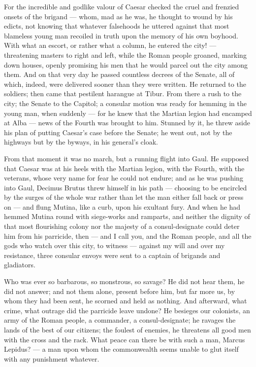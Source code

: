  For the incredible and godlike valour of Caesar checked the cruel and frenzied onsets of the brigand --- whom, mad as he was, he thought to wound by his edicts, not knowing that whatever falsehoods he uttered against that most blameless young man recoiled in truth upon the memory of his own boyhood. With what an escort, or rather what a column, he entered the city! --- threatening masters to right and left, while the Roman people groaned, marking down houses, openly promising his men that he would parcel out the city among them. And on that very day he passed countless decrees of the Senate, all of which, indeed, were delivered sooner than they were written. He returned to the soldiers; then came that pestilent harangue at Tibur. From there a rush to the city; the Senate to the Capitol; a consular motion was ready for hemming in the young man, when suddenly --- for he knew that the Martian legion had encamped at Alba --- news of the Fourth was brought to him. Stunned by it, he threw aside his plan of putting Caesar's case before the Senate; he went out, not by the highways but by the byways, in his general's cloak.

 From that moment it was no march, but a running flight into Gaul. He supposed that Caesar was at his heels with the Martian legion, with the Fourth, with the veterans, whose very name for fear he could not endure; and as he was pushing into Gaul, Decimus Brutus threw himself in his path --- choosing to be encircled by the surges of the whole war rather than let the man either fall back or press on --- and flung Mutina, like a curb, upon his exultant fury. And when he had hemmed Mutina round with siege-works and ramparts, and neither the dignity of that most flourishing colony nor the majesty of a consul-designate could deter him from his parricide, then --- and I call you, and the Roman people, and all the gods who watch over this city, to witness --- against my will and over my resistance, three consular envoys were sent to a captain of brigands and gladiators.

 Who was ever so barbarous, so monstrous, so savage? He did not hear them, he did not answer; and not them alone, present before him, but far more us, by whom they had been sent, he scorned and held as nothing. And afterward, what crime, what outrage did the parricide leave undone? He besieges our colonists, an army of the Roman people, a commander, a consul-designate; he ravages the lands of the best of our citizens; the foulest of enemies, he threatens all good men with the cross and the rack. What peace can there be with such a man, Marcus Lepidus? --- a man upon whom the commonwealth seems unable to glut itself with any punishment whatever.


